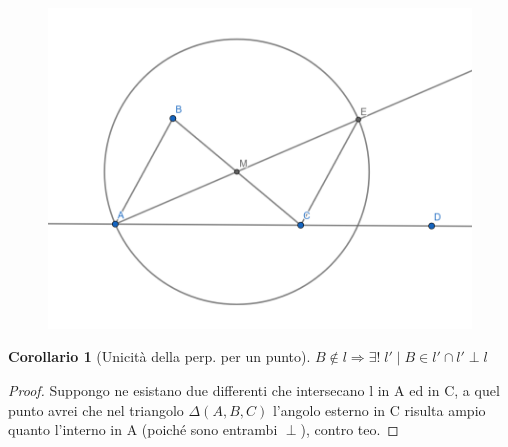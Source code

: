 \documentclass[a4paper,10pt]{article}
\theoremstyle{definition}
\theoremstyle{indentdefinition}
\theoremstyle{indentpostulate}
\theoremstyle{indenttheorem}
\newtheorem{cor}{Corollario}[section]
\theoremstyle{myremark}
\theoremstyle{indentgeneral}
\newenvironment{myboxed} 
{\noindent\begin{lrbox}{\mybox}\begin{minipage}{\textwidth}}
{\end{minipage}\end{lrbox}\fbox{\usebox{\mybox}}}
\begin{document}
\begin{figure}[H]
    \centering
    \includegraphics[scale=0.3]{AngoloEsterno.png}
\end{figure}

\begin{myboxed}
\begin{cor}[Unicità della perp. per un punto]  $B \not \in l \Rightarrow \exists !\; l' \mid B \in l' \cap l' \perp l$   
\end{cor} 
\end{myboxed}

\begin{proof}    Suppongo ne esistano due differenti che intersecano l in A ed in C, a quel punto avrei che nel triangolo $\Delta (A,B,C)$ l'angolo esterno in C risulta ampio quanto l'interno in A (poiché sono entrambi $\perp$), contro teo. \end{proof} 
\end{document}
